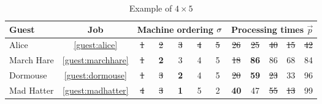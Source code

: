 \begin{table}[t!]\centering
\caption{Example of $4\times5$ \JSP}\label{tbl:example}
\begin{tabular}{lc|ccccc|ccccc} \toprule
Guest & \multicolumn{1}{c}{Job} & \multicolumn{5}{c}{Machine ordering 
${\mathbf{\sigma}}$} & \multicolumn{5}{c}{Processing times $\vec{p}$} \\ \midrule
Alice & \ref{guest:alice} & \st{1} & \st{2} & \st{3} & \st{4} & 
\st{5} & 
\st{26} & \st{25} & \st{40} & \st{15} & \st{42} \\
March Hare & \ref{guest:marchhare} & \st{1} & \textbf{2} & 3 & 4 & 5 & 
\st{18} & \textbf{86} & 86 & 68 & 84 \\
Dormouse & \ref{guest:dormouse} & \st{1} & \st{3} & \textbf{2} & 4 & 5 
& 
\st{20} & \textbf{59} & \st{23} & 33 & 96 \\
Mad Hatter & \ref{guest:madhatter} & \st{4} & \st{3} & \textbf{1} & 5 & 
2 & \textbf{40} & 47 & \st{55} & \st{13} & 99 
\\
\bottomrule
\end{tabular}
\end{table}